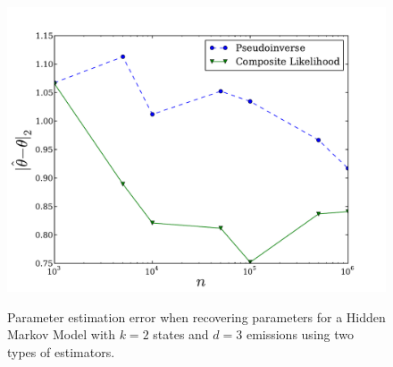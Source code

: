 \begin{figure}
  \centering
  \includegraphics[width=0.8\columnwidth]{figures/hmm-2-3.pdf}
    \label{fig:cl-hmm}
  \caption{Parameter estimation error when recovering parameters for a Hidden
  Markov Model with $k=2$ states and $d=3$ emissions using two types of estimators.}
\end{figure}
